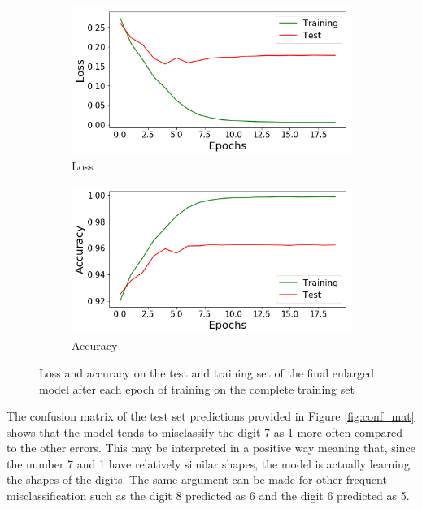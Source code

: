 \documentclass[12pt]{article}
\begin{document}
\begin{figure}[h]
	\centering
	\begin{subfigure}{0.49\textwidth}
		\includegraphics[width=\linewidth]{train_loss}
		\caption{Loss}
		\label{fig:trainA}
	\end{subfigure}
	\hspace*{\fill} %
	\begin{subfigure}{0.49\textwidth}
		\includegraphics[width=\linewidth]{train_acc}
		\caption{Accuracy}
		\label{fig:trainB}
	\end{subfigure}
	\caption{Loss and accuracy on the test and training set of the final enlarged model after each epoch of training on the complete training set}
	\label{fig:train_graphs}
\end{figure}

The confusion matrix of the test set predictions provided in Figure \ref{fig:conf_mat} shows that the model tends to misclassify the digit 7 as 1 more often compared to the other errors. This may be interpreted in a positive way meaning that, since the number 7 and 1 have relatively similar shapes, the model is actually learning the shapes of the digits. The same argument can be made for other frequent misclassification such as the digit 8 predicted as 6 and the digit 6 predicted as 5.
\end{document}
